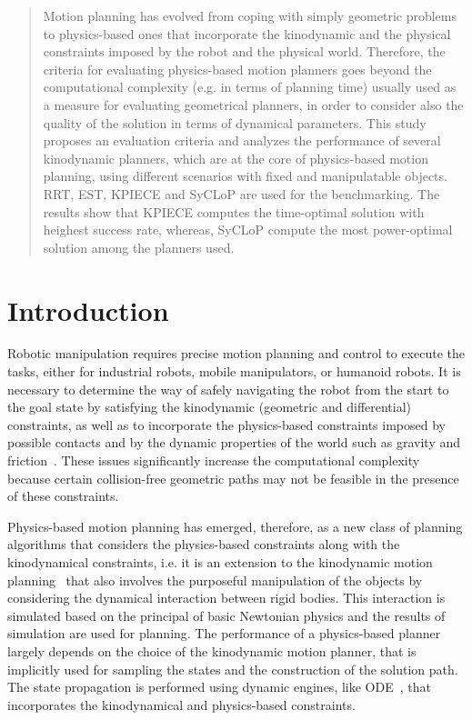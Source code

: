 \documentclass[runningheads,a4paper]{llncs}
\begin{document}
\begin{abstract}
Motion planning has evolved from coping with simply geometric problems to physics-based ones that incorporate the kinodynamic and the physical constraints imposed
by the robot and the physical world. Therefore, the criteria for evaluating physics-based motion planners goes beyond the computational complexity 
(e.g. in terms of planning time) usually used as a measure for evaluating geometrical planners, in order to consider also the quality of the solution in terms of dynamical parameters.
This study proposes an evaluation criteria and analyzes the performance of several kinodynamic planners, which are at the core of physics-based motion planning, using different scenarios with fixed and manipulatable objects.
RRT, EST, KPIECE and SyCLoP are used for the benchmarking. The results show that KPIECE computes the time-optimal solution with heighest success rate, whereas, 
SyCLoP compute the most power-optimal solution among the planners used.

\end{abstract}

\section{Introduction} \label{s-Introduction}
Robotic manipulation requires precise motion planning and control to execute the tasks, either for industrial robots, mobile manipulators, or humanoid robots.
It is necessary to determine the way of safely navigating the robot from the start to the goal state by satisfying the kinodynamic (geometric and differential)
constraints, as well as to incorporate the physics-based constraints imposed by possible contacts and by the dynamic properties of the world such as gravity and friction~\cite{tsianos2007,ladd2005}.
These issues  significantly increase the computational complexity because certain collision-free geometric paths may not be feasible in the presence of these constraints.

Physics-based motion planning has emerged, therefore, as a new class of planning algorithms that considers the physics-based constraints along with the
kinodynamical constraints, i.e. it is an extension to the kinodynamic motion planning~\cite{zickler2010} that also involves the purposeful manipulation
 of the objects by considering  the dynamical interaction between rigid bodies. This interaction is simulated based on the principal
of basic Newtonian physics and the results of simulation are used for planning. The performance of a physics-based planner largely depends on the choice
of the kinodynamic motion planner, that is implicitly used for sampling the states and the construction of the solution path. The  state propagation is performed using
dynamic engines, like ODE~\cite{OpenDE2007}, that incorporates the kinodynamical and physics-based constraints.
\end{document}
